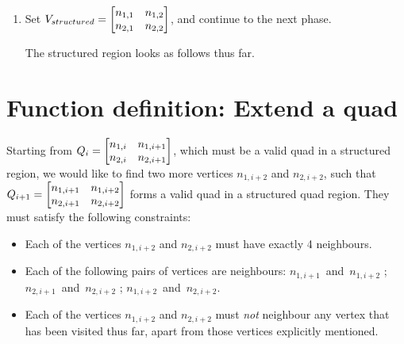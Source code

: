 \begin{enumerate}
\item Set $V_{structured} = \begin{bmatrix} n_{1,1} & n_{1,2} \\ n_{2,1} & n_{2,2} \end{bmatrix}$, and continue to the next phase.

The structured region looks as follows thus far.

\end{enumerate}









\section{Function definition: Extend a quad}
Starting from $Q_i = \begin{bmatrix} n_{1,i} & n_{1,i+1} \\ n_{2,i} & n_{2,i+1} \end{bmatrix}$, which must be a valid quad in a structured region, we would like to find two more vertices $n_{1, i+2}$ and $n_{2,i+2}$, such that $Q_{i+1} = \begin{bmatrix} n_{1,i+1} & n_{1,i+2} \\ n_{2,i+1} & n_{2,i+2} \end{bmatrix}$ forms a valid quad in a structured quad region. They must satisfy the following constraints:

\begin{itemize}
\item Each of the vertices $n_{1, i+2}$ and $n_{2,i+2}$ must have exactly 4 neighbours.
\item Each of the following pairs of vertices are neighbours: $n_{1,i+1}$~and~$n_{1,i+2}$ ; $n_{2,i+1}$~and~$n_{2,i+2}$ ; $n_{1,i+2}$~and~$n_{2,i+2}$.
\item Each of the vertices $n_{1, i+2}$ and $n_{2,i+2}$ must \emph{not} neighbour any vertex that has been visited thus far, apart from those vertices explicitly mentioned.
\end{itemize}

